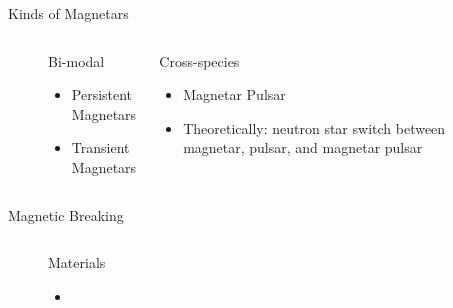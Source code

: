 \documentclass[hyperref=pdftex, presentation]{beamer}
\begin{document}


\begin{frame}{\Large Kinds of Magnetars}
	\begin{figure}
		\begin{columns}[c] %

			\begin{block}{Bi-modal}
				\begin{itemize}
					\item<2-> Persistent Magnetars
					\item<3-> Transient Magnetars
				\end{itemize}
			\end{block}
			\begin{block}{Cross-species}
				\begin{itemize}
 					\item<4-> Magnetar Pulsar%
 					\item<5-> Theoretically: neutron star switch between magnetar, pulsar, and magnetar pulsar
				\end{itemize}
			\end{block}
			

		\end{columns}
	\end{figure}
\end{frame}


\begin{frame}{\Large Magnetic Breaking}
	\begin{figure}
		\begin{columns}[c] %
			
			\begin{block}{Materials}
				\begin{itemize}
 					\item<2-> 
				\end{itemize}
			\end{block}
			
		\end{columns}
	\end{figure}
\end{frame}
\end{document}

